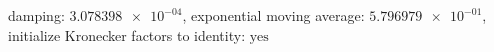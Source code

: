 damping: $\num[scientific-notation=true]{3.078398e-04}$, exponential moving average: $\num[scientific-notation=true]{5.796979e-01}$, initialize Kronecker factors to identity: $\text{yes}$